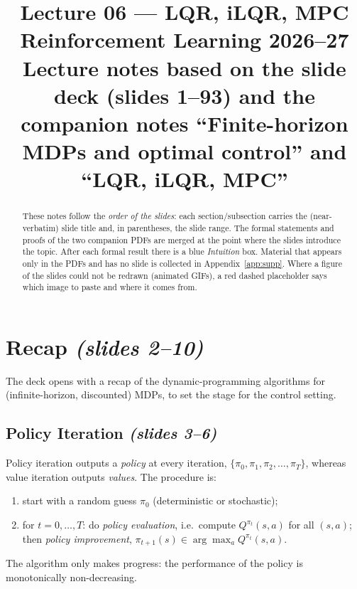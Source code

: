\documentclass[11pt,a4paper]{article}
\title{\textbf{Lecture 06 --- LQR, iLQR, MPC}\\[4pt]
\large Reinforcement Learning 2026--27 \\ Lecture notes based on the slide deck (slides 1--93) and the companion notes ``Finite-horizon MDPs and optimal control'' and ``LQR, iLQR, MPC''}
\author{}
\date{}
\newcommand{\slides}[1]{\emph{(slides #1)}}
\theoremstyle{plain}
\theoremstyle{definition}
\theoremstyle{remark}
\begin{document}
\maketitle
\vspace{-1.5cm}
\begin{abstract}\noindent
These notes follow the \emph{order of the slides}: each section/subsection carries the (near-verbatim) slide title and, in parentheses, the slide range. The formal statements and proofs of the two companion PDFs are merged at the point where the slides introduce the topic. After each formal result there is a blue \emph{Intuition} box. Material that appears only in the PDFs and has no slide is collected in Appendix~\ref{app:supp}. Where a figure of the slides could not be redrawn (animated GIFs), a red dashed placeholder says which image to paste and where it comes from.
\end{abstract}
\tableofcontents
\newpage

\section{Recap \slides{2--10}}

The deck opens with a recap of the dynamic-programming algorithms for (infinite-horizon, discounted) MDPs, to set the stage for the control setting.

\subsection{Policy Iteration \slides{3--6}}

Policy iteration outputs a \emph{policy} at every iteration, $\{\pi_0,\pi_1,\pi_2,\dots,\pi_T\}$, whereas value iteration outputs \emph{values}. The procedure is:
\begin{enumerate}[nosep]
  \item start with a random guess $\pi_0$ (deterministic or stochastic);
  \item for $t=0,\dots,T$: do \emph{policy evaluation}, i.e.\ compute $Q^{\pi_t}(s,a)$ for all $(s,a)$; then \emph{policy improvement}, $\pi_{t+1}(s)\in\arg\max_a Q^{\pi_t}(s,a)$.
\end{enumerate}
The algorithm only makes progress: the performance of the policy is monotonically non-decreasing.
\end{document}
